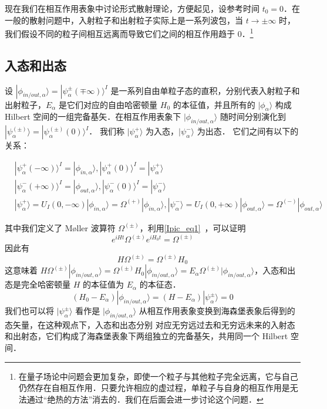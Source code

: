
现在我们在相互作用表象中讨论形式散射理论，方便起见，设参考时间 $t_0=0$．在一般的散射问题中，入射粒子和出射粒子实际上是一系列波包，当 $t\rightarrow \pm\infty$ 时，我们假设不同的粒子间相互远离而导致它们之间的相互作用趋于 $0$．\footnote{在量子场论中问题会更加复杂，即使一个粒子与其他粒子完全远离，它与自己仍然存在自相互作用．只要允许相应的虚过程，单粒子与自身的相互作用是无法通过“绝热的方法”消去的．我们在后面会进一步讨论这个问题．}
\subsection{入态和出态}
设 $|\phi_{in/out,\alpha}\rangle=|\psi_\alpha^{\pm}(\mp \infty)\rangle^I$ 是一系列自由单粒子态的直积，分别代表入射粒子和出射粒子，$E_\alpha$ 是它们对应的自由哈密顿量 $H_0$ 的本征值，并且所有的 $|\phi_\alpha\rangle$ 构成 Hilbert 空间的一组完备基矢．在相互作用表象下 $|\phi_{in/out,\alpha}\rangle$ 随时间分别演化到  $|\psi_\alpha^{(\pm)}\rangle=|\psi_\alpha^{(\pm)}(0)\rangle^I$．
我们称 $|\psi_\alpha^{+}\rangle$ 为入态，$|\psi_\alpha^{-}\rangle$ 为出态． 它们之间有以下的关系：

\begin{equation}
\begin{aligned}
&|\psi_\alpha^{+}(-\infty)\rangle^I=|\phi_{in,\alpha}\rangle,|\psi_\alpha^{+}(0)\rangle^I=|\psi_\alpha^{+}\rangle\\
&|\psi_\alpha^{-}(+\infty)\rangle^I=|\phi_{out,\alpha}\rangle,|\psi_\alpha^{-}(0)\rangle^I=|\psi_\alpha^{-}\rangle\\
&|\psi_\alpha^+\rangle=U_I(0,-\infty)|\phi_{in,\alpha}\rangle = \Omega^{(+)} |\phi_{in,\alpha}\rangle,
|\psi_\alpha^-\rangle=U_I(0,+\infty)|\phi_{out,\alpha} \rangle = \Omega^{(-)} |\phi_{out,\alpha}\rangle
\end{aligned}
\end{equation}

其中我们定义了 Møller 波算符 $\Omega^{(\pm)}$，利用\autoref{Ipic_eq1}~，可以证明
\begin{equation}
e^{iHt}\Omega^{(\pm)} e^{iH_0 t}=\Omega^{(\pm)}
\end{equation}
因此有
\begin{equation}
H\Omega^{(\pm)}=\Omega^{(\pm)}H_0
\end{equation}
这意味着 $H\Omega^{(\pm)}|\phi_{in/out,\alpha}\rangle=\Omega^{(\pm)}H_0|\phi_{in/out,\alpha}\rangle =E_\alpha \Omega^{(\pm)}|\phi_{in/out,\alpha}\rangle$，入态和出态是完全哈密顿量 $H$ 的本征值为 $E_\alpha$ 的本征态．
\begin{equation}
(H_0-E_\alpha)|\phi_{in/out,\alpha}\rangle=(H-E_\alpha)|\psi_\alpha^{\pm}\rangle=0
\end{equation}
我们也可以将 $|\psi_\alpha^{\pm}\rangle$ 看作是 $|\phi_{in/out,\alpha}\rangle$ 从相互作用表象变换到海森堡表象后得到的态矢量，在这种观点下，入态和出态分别 对应无穷远过去和无穷远未来的入射态和出射态，它们构成了海森堡表象下两组独立的完备基矢，共用同一个 Hilbert 空间．

